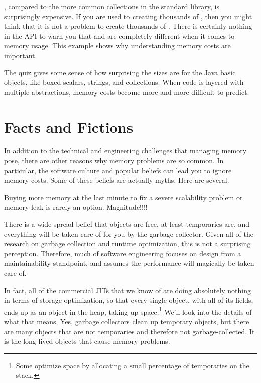 , compared to the more common
collections in the standard library, is surprisingly expensive. If you are used to creating
thousands of , then you might think that it is not a problem to
create thousands of . There is certainly nothing in
the API to warn you that  and  are
completely different when it comes to memory usage. This example shows why
understanding memory costs are important.

The quiz gives some sense of how surprising the sizes are for the Java basic
objects, like boxed scalars, strings, and collections. When code is layered
with multiple abstractions, memory costs become more and more difficult to
predict.

\section{Facts and Fictions}

In addition to the technical and engineering challenges that managing memory
pose, there are other reasons why memory problems are so common. In particular,
the software culture and popular beliefs can lead you to ignore memory costs. 
Some of these beliefs are actually myths.  Here are several.

 {
Buying more memory at the last minute to fix a severe scalability problem or
memory leak is rarely an option.  Magnitude!!!!
}  


There is a wide-spread belief that objects are free, at least temporaries are,
and everything will be taken care of for you by the garbage collector.
Given all of the research on garbage collection and runtime optimization, this
is not a surprising perception. Therefore, much of software engineering focuses on
design from a maintainability standpoint, and assumes the performance will
magically be taken care of.

In fact, all of the commercial JITs that
we know of are doing absolutely nothing in terms of storage optimization, so
that every single object, with all of its fields, ends up as an object in the
heap, taking up space.\footnote{Some \JITs optimize space by allocating a
small percentage of temporaries on the stack.} We'll look into the details of what that means. Yes,
garbage collectors clean up temporary objects, but there are many objects that are not 
temporaries and therefore not garbage-collected. It is the
long-lived objects that cause memory problems.



